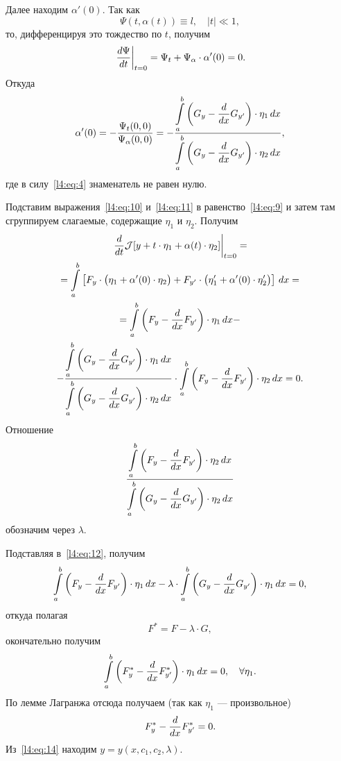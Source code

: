 Далее находим $\alpha'(0)$. Так как 
\begin{equation*}
	\Psi(t,\alpha(t))\equiv l,\quad|t|\ll1,
\end{equation*}
то, дифференцируя это тождество по $t$, получим
\begin{equation*}
	\left.\frac{d\Psi}{dt}\right|_{t=0}=\Psi_t+\Psi_{\alpha}\cdot\alpha'(0)=0.
\end{equation*}
Откуда
\begin{equation}
	\label{l4:eq:11}
	\alpha'(0)=-\frac{\Psi_t(0,0)}{\Psi_{\alpha}(0,0)}=-\frac{\displaystyle\int\limits_a^b\left(G_y-\frac{d}{dx}G_{y'}\right)\cdot\eta_1\,dx}{\displaystyle\int\limits_a^b\left(G_y-\frac{d}{dx}G_{y'}\right)\cdot\eta_2\,dx},
\end{equation}
где в силу~\eqref{l4:eq:4} знаменатель не равен нулю.

Подставим выражения~\eqref{l4:eq:10} и~\eqref{l4:eq:11} в равенство~\eqref{l4:eq:9} и затем там сгруппируем слагаемые, содержащие $\eta_1$ и $\eta_2$. Получим
\begin{multline}
	\label{l4:eq:12}
	\left.\frac{d}{dt}\mathcal{J}[y+t\cdot\eta_1+\alpha(t)\cdot\eta_2]\right|_{t=0}=\\=\int\limits_a^b\left[F_y\cdot\big(\eta_1+\alpha'(0)\cdot\eta_2\big)+F_{y'}\cdot\big(\eta'_1+\alpha'(0)\cdot\eta'_2\big)\right]\,dx=\\=
	\int\limits_a^b\left(F_y-\frac{d}{dx}F_{y'}\right)\cdot\eta_1\,dx-\\-\frac{\displaystyle\int\limits_a^b\left(G_y-\frac{d}{dx}G_{y'}\right)\cdot\eta_1\,dx}{\displaystyle\int\limits_a^b\left(G_y-\frac{d}{dx}G_{y'}\right)\cdot\eta_2\,dx}\cdot\int\limits_a^b\left(F_y-\frac{d}{dx}F_{y'}\right)\cdot\eta_2\,dx=0.
\end{multline} 
 Отношение
\begin{equation*}
	\frac{\displaystyle\int\limits_a^b\left(F_y-\frac{d}{dx}F_{y'}\right)\cdot\eta_2\,dx}{\displaystyle\int\limits_a^b\left(G_y-\frac{d}{dx}G_{y'}\right)\cdot\eta_2\,dx}
\end{equation*}
обозначим через $\lambda$.

Подставляя в~\eqref{l4:eq:12}, получим
\begin{equation*}
	\int\limits_a^b\left(F_y-\frac{d}{dx}F_{y'}\right)\cdot\eta_1\,dx-\lambda\cdot\int\limits_a^b\left(G_y-\frac{d}{dx}G_{y'}\right)\cdot\eta_1\,dx=0,
\end{equation*} 
откуда полагая
\begin{equation*}
	 F^{\ast}=F-\lambda\cdot G,
\end{equation*}
окончательно получим
\begin{equation}
	\label{l4:eq:13}
	\int\limits_a^b\left(F^{\ast}_y-\frac{d}{dx}F^{\ast}_{y'}\right)\cdot\eta_1\,dx=0,\quad\forall\eta_1.
\end{equation} 
По лемме Лагранжа отсюда получаем (так как $\eta_1$ --- произвольное)
\begin{equation}
	\label{l4:eq:14}
	 F^{\ast}_y-\frac{d}{dx}F^{\ast}_{y'}=0.
\end{equation}
Из~\eqref{l4:eq:14} находим $y=y(x,c_1,c_2,\lambda)$. 

